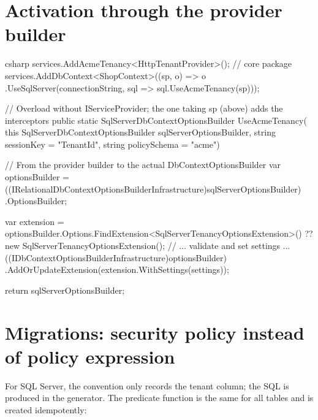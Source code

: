 \section{Activation through the provider builder}

\begin{sourcecode}{csharp}
services.AddAcmeTenancy<HttpTenantProvider>();                    // core package
services.AddDbContext<ShopContext>((sp, o) => o
    .UseSqlServer(connectionString, sql => sql.UseAcmeTenancy(sp)));

// Overload without IServiceProvider; the one taking sp (above) adds the interceptors
public static SqlServerDbContextOptionsBuilder UseAcmeTenancy(
    this SqlServerDbContextOptionsBuilder sqlServerOptionsBuilder,
    string sessionKey = "TenantId",
    string policySchema = "acme")
{
    // From the provider builder to the actual DbContextOptionsBuilder
    var optionsBuilder =
        ((IRelationalDbContextOptionsBuilderInfrastructure)sqlServerOptionsBuilder)
        .OptionsBuilder;

    var extension = optionsBuilder.Options.FindExtension<SqlServerTenancyOptionsExtension>()
                    ?? new SqlServerTenancyOptionsExtension();
    // ... validate and set settings ...
    ((IDbContextOptionsBuilderInfrastructure)optionsBuilder)
        .AddOrUpdateExtension(extension.WithSettings(settings));

    return sqlServerOptionsBuilder;
}
\end{sourcecode}

\section{Migrations: security policy instead of policy expression}

For SQL Server, the convention only records the tenant column; the SQL is produced in the
generator. The predicate function is the same for all tables and is created idempotently:

